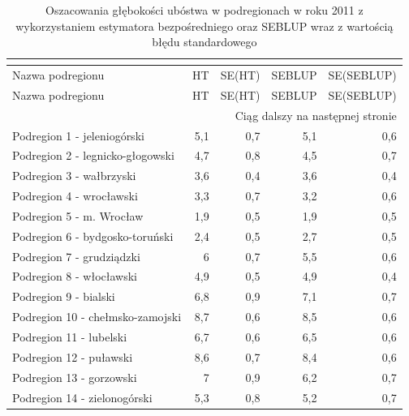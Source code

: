 \begin{center}
\footnotesize
\begin{longtable}{p{6cm}rrrr}
\caption{Oszacowania głębokości ubóstwa w podregionach w roku 2011 z wykorzystaniem estymatora bezpośredniego oraz SEBLUP wraz z wartością błędu standardowego}\\
\label{tab:podreg_pgi}\\
\hline
Nazwa podregionu & HT & SE(HT) & SEBLUP & SE(SEBLUP) \\
  \hline
\endfirsthead
  \hline
Nazwa podregionu & HT & SE(HT) & SEBLUP & SE(SEBLUP) \\
  \hline
\endhead
\hline \multicolumn{5}{|r|}{{Ciąg dalszy na następnej stronie}} \\
\hline
\endfoot
\hline
\endlastfoot
\hline
Podregion 1 - jeleniogórski              & 5,1     & 0,7         & 5,1      & 0,6          \\
Podregion 2 - legnicko-głogowski         & 4,7     & 0,8         & 4,5      & 0,7          \\
Podregion 3 - wałbrzyski                 & 3,6     & 0,4         & 3,6      & 0,4          \\
Podregion 4 - wrocławski                 & 3,3     & 0,7         & 3,2      & 0,6          \\
Podregion 5 - m. Wrocław                 & 1,9     & 0,5         & 1,9      & 0,5          \\
Podregion 6 - bydgosko-toruński          & 2,4     & 0,5         & 2,7      & 0,5          \\
Podregion 7 - grudziądzki                & 6       & 0,7         & 5,5      & 0,6          \\
Podregion 8 - włocławski                 & 4,9     & 0,5         & 4,9      & 0,4          \\
Podregion 9 - bialski                    & 6,8     & 0,9         & 7,1      & 0,7          \\
Podregion 10 - chełmsko-zamojski         & 8,7     & 0,6         & 8,5      & 0,6          \\
Podregion 11 - lubelski                  & 6,7     & 0,6         & 6,5      & 0,6          \\
Podregion 12 - puławski                  & 8,6     & 0,7         & 8,4      & 0,6          \\
Podregion 13 - gorzowski                 & 7       & 0,9         & 6,2      & 0,7          \\
Podregion 14 - zielonogórski             & 5,3     & 0,8         & 5,2      & 0,7          \\

\end{longtable}
\end{center}

